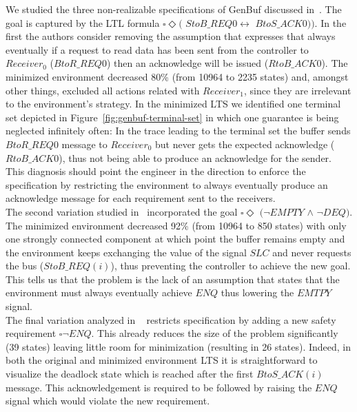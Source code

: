 We studied the three non-realizable specifications of GenBuf discussed in~\cite{DBLP:conf/fmcad/KonighoferHB09}. 
The goal is captured by the LTL formula $\square\Diamond($ $StoB\_REQ0  \leftrightarrow$ $BtoS\_ACK0))$.
 In the first the authors consider removing the assumption 
that expresses that always eventually if a request to read data
has been sent from the controller to $Receiver_0$ ($BtoR\_REQ0$) then
an acknowledge will be issued ($RtoB\_ACK0$).  
The minimized environment decreased 80\%
(from 10964 to 2235 states) and, amongst other things, excluded all actions related with $Receiver_1$,
since they are irrelevant to the environment's strategy.
In the minimized LTS we identified one terminal set
depicted in Figure~\ref{fig:genbuf-terminal-set} in which one guarantee is being 
neglected infinitely often: 
  In the trace leading to the terminal set
the buffer sends \\$BtoR\_REQ0$ message to $Receiver_0$ but
never gets the expected acknowledge ($RtoB\_ACK0$), thus
not being able to produce an acknowledge for the sender.  This
diagnosis should point the engineer in the direction to
enforce the specification by restricting the environment to always
eventually produce an acknowledge message for each requirement
sent to the receivers.\\
The second variation studied in~\cite{DBLP:conf/fmcad/KonighoferHB09}  incorporated the goal 
$\square \Diamond$ $(\neg EMPTY$ $\wedge$ $\neg DEQ)$.
The minimized environment decreased 92\%
(from 10964 to 850 states)
with only one strongly connected component at which point the buffer remains empty and the environment keeps exchanging the value of the
signal $SLC$ and never requests the bus ($StoB\_REQ(i)$), thus preventing the controller to achieve the new goal. This tells us that the problem is the lack of an assumption that states that the environment must always eventually achieve $ENQ$ thus lowering the $EMTPY$ signal. 
\\
The final variation analyzed in ~\cite{DBLP:conf/fmcad/KonighoferHB09} restricts specification by
adding a new safety requirement $\square \neg ENQ$. This already reduces the size of the 
problem significantly (39 states) leaving little room for minimization (resulting in 26 states). Indeed, in both the original and minimized environment LTS it is straightforward to visualize the deadlock state which is reached after the first
$BtoS\_ACK(i)$ message. This acknowledgement is required to be followed by raising the $ENQ$ signal which would violate the new requirement. 


